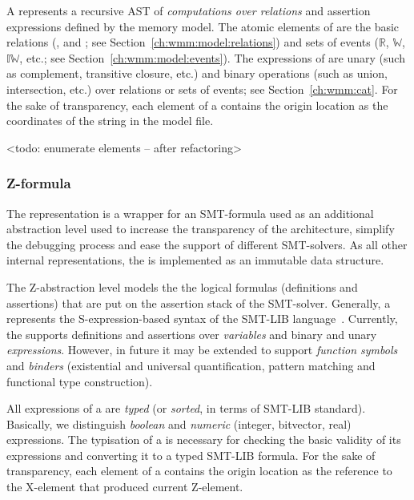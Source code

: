 A \wmodel{} represents a recursive AST of \textit{computations over relations} and assertion expressions defined by the memory model.
The atomic elements of \wmodel{} are the basic relations (\po, \rf and \co; see Section~\ref{ch:wmm:model:relations}) and sets of events ($\mathbb{R}$, $\mathbb{W}$, $\mathbb{IW}$, etc.; see Section~\ref{ch:wmm:model:events}).
The expressions of \wmodel{} are unary (such as complement, transitive closure, etc.) and binary operations (such as union, intersection, etc.) over relations or sets of events; see Section~\ref{ch:wmm:cat}.
For the sake of transparency, each element of a \wmodel{} contains the origin location as the coordinates of the string in the model file. %

<todo: enumerate elements -- after refactoring>




\subsubsection{Z-formula}
\label{ch:impl:model:zformula}


The \zformula{} representation is a wrapper for an SMT-formula used as an additional abstraction level used to increase the transparency of the architecture, simplify the debugging process and ease the support of different SMT-solvers.
As all other internal representations, the \zformula{} is implemented as an immutable data structure.

The Z-abstraction level models the the logical formulas (definitions and assertions) that are put on the assertion stack of the SMT-solver.
Generally, a \zformula{} represents the S-expression-based syntax of the SMT-LIB language~\cite{smt-lib}. %
Currently, the \zformula{} supports definitions and assertions over \textit{variables} and binary and unary \textit{expressions}.
However, in future it may be extended to support \textit{function symbols} and \textit{binders} (existential and universal quantification, pattern matching and functional type construction).

All expressions of a \zformula{} are \textit{typed} (or \textit{sorted}, in terms of SMT-LIB standard).
Basically, we distinguish \textit{boolean} and \textit{numeric} (integer, bitvector, real) expressions.
The typisation of a \zformula{} is necessary for checking the basic validity of its expressions and converting it to a typed SMT-LIB formula.
For the sake of transparency, each element of a \zformula{} contains the origin location as the reference to the X-element that produced current Z-element. %

